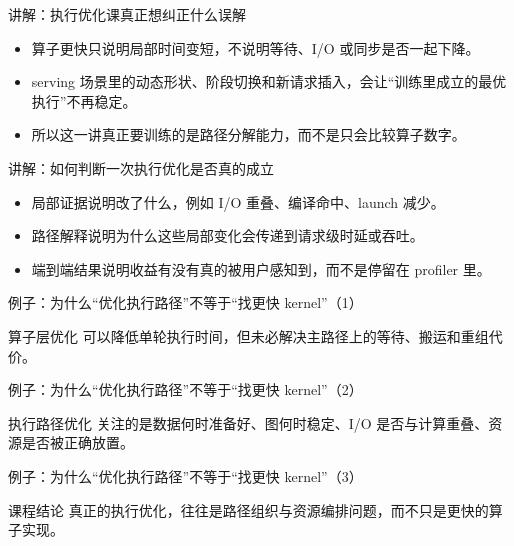 \begin{frame}{讲解：执行优化课真正想纠正什么误解}
  \begin{itemize}
    \item 算子更快只说明局部时间变短，不说明等待、I/O 或同步是否一起下降。
    \item serving 场景里的动态形状、阶段切换和新请求插入，会让“训练里成立的最优执行”不再稳定。
    \item 所以这一讲真正要训练的是路径分解能力，而不是只会比较算子数字。
  \end{itemize}
\end{frame}

\begin{frame}{讲解：如何判断一次执行优化是否真的成立}
  \begin{itemize}
    \item 局部证据说明改了什么，例如 I/O 重叠、编译命中、launch 减少。
    \item 路径解释说明为什么这些局部变化会传递到请求级时延或吞吐。
    \item 端到端结果说明收益有没有真的被用户感知到，而不是停留在 profiler 里。
  \end{itemize}
\end{frame}

\begin{frame}{例子：为什么“优化执行路径”不等于“找更快 kernel”（1）}
\begin{block}{算子层优化}
    可以降低单轮执行时间，但未必解决主路径上的等待、搬运和重组代价。
  \end{block}
\end{frame}

\begin{frame}{例子：为什么“优化执行路径”不等于“找更快 kernel”（2）}
\begin{block}{执行路径优化}
    关注的是数据何时准备好、图何时稳定、I/O 是否与计算重叠、资源是否被正确放置。
  \end{block}
\end{frame}

\begin{frame}{例子：为什么“优化执行路径”不等于“找更快 kernel”（3）}
\begin{block}{课程结论}
    真正的执行优化，往往是路径组织与资源编排问题，而不只是更快的算子实现。
  \end{block}
\end{frame}

